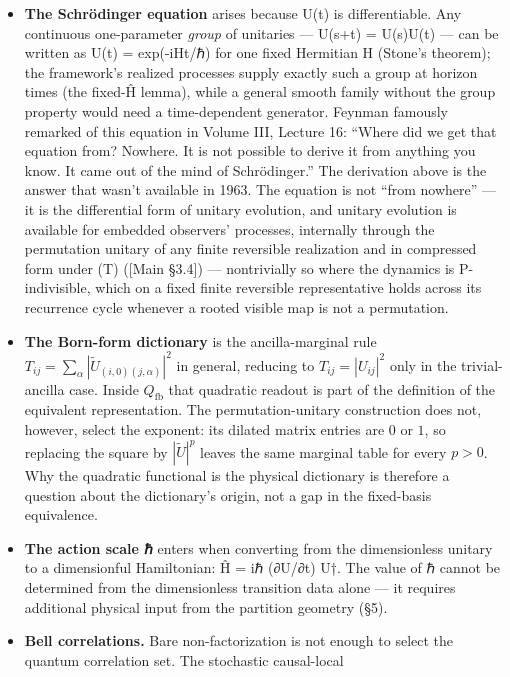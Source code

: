 \documentclass[
]{article}
\begin{document}
\begin{itemize}
\item
  \textbf{The Schrödinger equation} arises because U(t) is
  differentiable. Any continuous one-parameter \emph{group} of unitaries
  --- U(s+t) = U(s)U(t) --- can be written as U(t) = exp(-iHt/ℏ) for one
  fixed Hermitian H (Stone's theorem); the framework's realized
  processes supply exactly such a group at horizon times (the fixed-Ĥ
  lemma), while a general smooth family without the group property would
  need a time-dependent generator. Feynman famously remarked of this
  equation in Volume III, Lecture 16: ``Where did we get that equation
  from? Nowhere. It is not possible to derive it from anything you know.
  It came out of the mind of Schrödinger.'' The derivation above is the
  answer that wasn't available in 1963. The equation is not ``from
  nowhere'' --- it is the differential form of unitary evolution, and
  unitary evolution is available for embedded observers' processes,
  internally through the permutation unitary of any finite reversible
  realization and in compressed form under (T) ({[}Main §3.4{]}) ---
  nontrivially so where the dynamics is P-indivisible, which on a fixed
  finite reversible representative holds across its recurrence cycle
  whenever a rooted visible map is not a permutation.
\item
  \textbf{The Born-form dictionary} is the ancilla-marginal rule
  \(T_{ij}=\sum_\alpha |\widetilde U_{(i,0)(j,\alpha)}|^2\) in general,
  reducing to \(T_{ij}=|U_{ij}|^2\) only in the trivial-ancilla case.
  Inside \(Q_{\mathrm{fb}}\) that quadratic readout is part of the
  definition of the equivalent representation. The permutation-unitary
  construction does not, however, select the exponent: its dilated
  matrix entries are \(0\) or \(1\), so replacing the square by
  \(|\widetilde U|^p\) leaves the same marginal table for every \(p>0\).
  Why the quadratic functional is the physical dictionary is therefore a
  question about the dictionary's origin, not a gap in the fixed-basis
  equivalence.
\item
  \textbf{The action scale ℏ} enters when converting from the
  dimensionless unitary to a dimensionful Hamiltonian: Ĥ = iℏ (∂U/∂t)
  U†. The value of ℏ cannot be determined from the dimensionless
  transition data alone --- it requires additional physical input from
  the partition geometry (§5).
\item
  \textbf{Bell correlations.} Bare non-factorization is not enough to
  select the quantum correlation set. The stochastic causal-local

\end{itemize}
\end{document}
